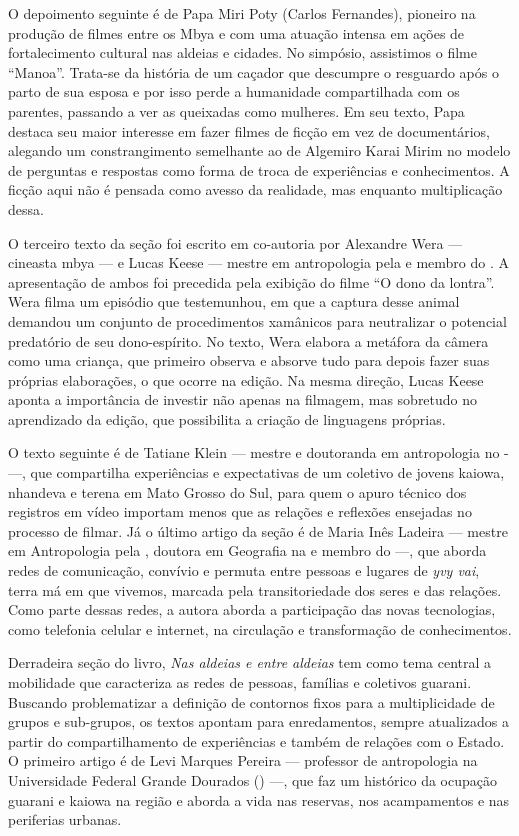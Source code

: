 O depoimento seguinte é de Papa Miri Poty (Carlos
Fernandes), pioneiro na produção de filmes entre os Mbya e com uma
atuação intensa em ações de fortalecimento cultural nas aldeias e
cidades. No simpósio, assistimos o filme ``Manoa''. Trata-se da história
de um caçador que descumpre o resguardo após o parto de sua esposa e
por isso perde a humanidade compartilhada com os parentes, passando a
ver as queixadas como mulheres. Em seu texto, Papa destaca seu maior
interesse em fazer filmes de ficção em vez de documentários, alegando
um constrangimento semelhante ao de Algemiro Karai Mirim no modelo de
perguntas e respostas como forma de troca de experiências e
conhecimentos. A ficção aqui não é pensada como avesso da realidade,
mas enquanto multiplicação dessa. 

O terceiro texto da seção foi escrito em co-autoria por Alexandre Wera ---
cineasta mbya --- e Lucas Keese --- mestre em antropologia pela  e
membro do . A apresentação de ambos foi precedida pela exibição do
filme ``O dono da lontra''. Wera filma um episódio que testemunhou, em
que a captura desse animal demandou um conjunto de procedimentos
xamânicos para neutralizar o potencial predatório de seu dono-espírito.
No texto, Wera elabora a metáfora da câmera como uma criança, que
primeiro observa e absorve tudo para depois fazer suas próprias
elaborações, o que ocorre na edição. Na mesma direção, Lucas Keese
aponta a importância de investir não apenas na filmagem, mas sobretudo
no aprendizado da edição, que possibilita a criação de linguagens
próprias. 

O texto seguinte é de Tatiane Klein --- mestre e doutoranda em
antropologia no - ---, que compartilha experiências e
expectativas de um coletivo de jovens kaiowa, nhandeva e terena em Mato
Grosso do Sul, para quem o apuro técnico dos registros em vídeo
importam menos que as relações e reflexões ensejadas no processo de
filmar. Já o último artigo da seção é de Maria Inês Ladeira --- mestre em
Antropologia pela , doutora em Geografia na  e membro do  ---,
que aborda redes de comunicação, convívio e permuta entre pessoas e
lugares de \emph{yvy vai}, terra má em que vivemos, marcada pela
transitoriedade dos seres e das relações. Como parte dessas redes, a
autora aborda a participação das novas tecnologias, como telefonia
celular e internet, na circulação e transformação de conhecimentos.

Derradeira seção do livro, \emph{Nas aldeias e entre aldeias} tem como tema
central a mobilidade que caracteriza as redes de pessoas, famílias e
coletivos guarani. Buscando problematizar a definição de contornos
fixos para a multiplicidade de grupos e sub-grupos, os textos apontam
para enredamentos, sempre atualizados a partir do compartilhamento de
experiências e também de relações com o Estado. O primeiro artigo é de
Levi Marques Pereira --- professor de antropologia na Universidade
Federal Grande Dourados () ---, que faz um histórico da ocupação
guarani e kaiowa na região e aborda a vida nas reservas, nos
acampamentos e nas periferias urbanas. 

